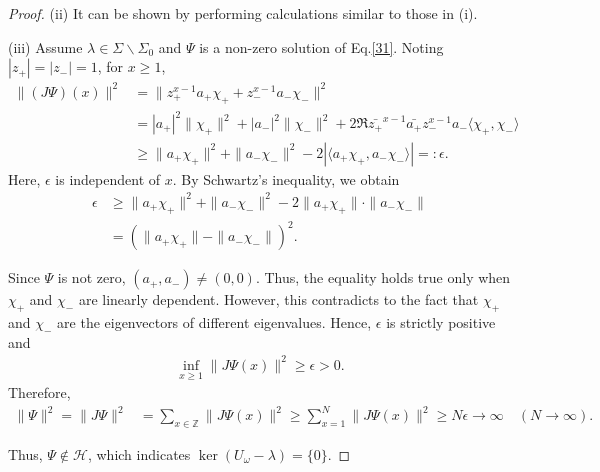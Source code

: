 \documentclass[a4paper,12pt]{article}
\theoremstyle{plain}
\theoremstyle{definition}
\theoremstyle{definition}
\begin{document}
\begin{proof}
(ii) It can be shown by performing calculations similar to those in (i).




(iii) Assume $\lambda \in \Sigma \backslash \Sigma_0$ and $\Psi$ is a non-zero solution of Eq.\eqref{31}. 
Noting $|z_{+}|=|z_{-}|=1$, for $x \ge 1$,
\begin{align*}
    \| (J\Psi)(x)\|^2
    &= \|z_{+}^{x-1} a_{+} \chi_{+} +z_{-} ^{x-1}a_{-}\chi_{-} \|^2 \\
    &= |a_{+}|^2 \|\chi_{+} \|^2 + |a_{-}|^2 \| \chi_{-} \|^2 + 2\Re \bar{z_{+}}^{x-1} \bar{a_{+}}z_{-}^{x-1} a_{-}\langle\chi_{+},\chi_{-}\rangle \\
    &\geq \| a_{+}\chi _{+} \|^2 + \|a_{-}\chi_{-} \|^2 -2|\langle a_{+}\chi_{+},a_{-}\chi_{-} \rangle| =: \epsilon .
    \end{align*}
Here, $\epsilon$ is independent of $x$.
By Schwartz's inequality, we obtain 
\begin{align*}
  \epsilon &\geq \| a_{+}\chi _{+} \|^2 + \|a_{-}\chi_{-} \|^2 -2\| a_{+}\chi_{+}\|\cdot \|a_{-}\chi_{-}\| \\
  &=(\| a_{+}\chi_{+}\|-\|a_{-}\chi_{-}\|)^2.
\end{align*}

Since $\Psi$ is not zero, $(a_+, a_-) \neq (0,0)$. Thus, the equality holds true only when $\chi_{+}$ and $\chi_{-}$ are linearly dependent. However, this contradicts to the fact that $\chi_{+}$ and $\chi_{-}$ are the eigenvectors of different eigenvalues.
Hence, $\epsilon$ is strictly positive and 
\begin{align*}
\inf _{x \geq 1} \| J\Psi (x) \|^2 \geq \epsilon > 0.
\end{align*}
Therefore,
\begin{align*}
    \|\Psi\|^2 = \|J\Psi \|^2 &= \sum _{x\in \mathbb{Z}} \|J\Psi (x) \|^2 \geq \sum _{x=1}^{N}\|J\Psi (x) \|^2 \geq N\epsilon \rightarrow  \infty \quad (N\rightarrow \infty).
\end{align*}

Thus, $\Psi \notin \mathcal{H}$, which indicates $\ker(U_{\omega}-\lambda) =\{0\}$.


\end{proof}
\end{document}
